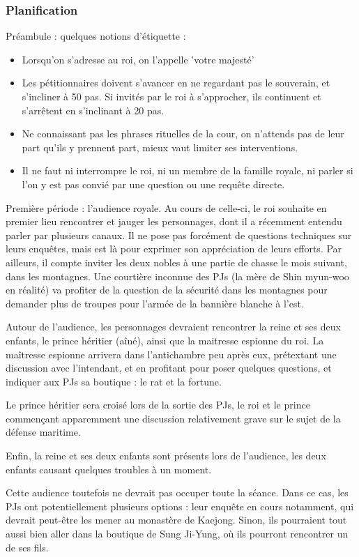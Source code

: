 \documentclass[10pt,a4paper]{book}
\begin{document}
\subsubsection{Planification}
Préambule : quelques notions d'étiquette :
\begin{itemize}
\item Lorsqu'on s'adresse au roi, on l'appelle 'votre majesté'
\item Les pétitionnaires doivent s'avancer en ne regardant pas le souverain, et s'incliner à 50 pas. Si invités par le roi à s'approcher, ils continuent et s'arrêtent en s'inclinant à 20 pas.
\item Ne connaissant pas les phrases rituelles de la cour, on n'attends pas de leur part qu'ils y prennent part, mieux vaut limiter ses interventions.
\item Il ne faut ni interrompre le roi, ni un membre de la famille royale, ni parler si l'on y est pas convié par une question ou une requête directe.

\end{itemize}
Première période : l'audience royale. Au cours de celle-ci, le roi souhaite en premier lieu rencontrer et jauger les personnages, dont il a récemment entendu parler par plusieurs canaux. Il ne pose pas forcément de questions techniques sur leurs enquêtes, mais est là pour exprimer son appréciation de leurs efforts. Par ailleurs, il compte inviter les deux nobles à une partie de chasse le mois suivant, dans les montagnes. Une courtière inconnue des PJs (la mère de Shin myun-woo en réalité) va profiter de la question de la sécurité dans les montagnes pour demander plus de troupes pour l'armée de la bannière blanche à l'est.

Autour de l'audience, les personnages devraient rencontrer la reine et ses deux enfants, le prince héritier (aîné), ainsi que la maitresse espionne du roi. La maîtresse espionne arrivera dans l'antichambre peu après eux, prétextant une discussion avec l'intendant, et en profitant pour poser quelques questions, et indiquer aux PJs sa boutique : le rat et la fortune.

Le prince héritier sera croisé lors de la sortie des PJs, le roi et le prince commençant apparemment une discussion relativement grave sur le sujet de la défense maritime.

Enfin, la reine et ses deux enfants sont présents lors de l'audience, les deux enfants causant quelques troubles à un moment.


Cette audience toutefois ne devrait pas occuper toute la séance. Dans ce cas, les PJs ont potentiellement plusieurs options : leur enquête en cours notamment, qui devrait peut-être les mener au monastère de Kaejong. Sinon, ils pourraient tout aussi bien aller dans la boutique de Sung Ji-Yung, où ils pourront rencontrer un de ses fils.
\end{document}

